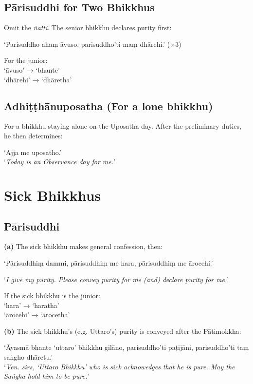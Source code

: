 \subsection{Pārisuddhi for Two Bhikkhus}

Omit the \emph{ñatti}. The senior bhikkhu declares purity first:

‘Parisuddho ahaṃ āvuso, parisuddho'ti maṃ dhārehi.’ (×3)

For the junior:\\
‘āvuso’ → ‘bhante’\\
‘dhārehi’ → ‘dhāretha’

\subsection{Adhiṭṭhānuposatha (For a lone bhikkhu)}

For a bhikkhu staying alone on the Uposatha day. After the preliminary duties,
he then determines:

‘Ajja me uposatho.’\\
‘\emph{Today is an Observance day for me.}’

\section{Sick Bhikkhus}

\subsection{Pārisuddhi}

\textbf{(a)} The sick bhikkhu makes general confession, then:

‘Pārisuddhiṃ dammi, pārisuddhiṃ me hara, pārisuddhiṃ me ārocehi.’

‘\emph{I give my purity. Please convey purity for me (and) declare purity for me.}’

If the sick bhikkhu is the junior:\\
‘hara’ → ‘haratha’\\
‘ārocehi’ → ‘ārocetha’

\clearpage

\textbf{(b)} The sick bhikkhu's (e.g. Uttaro's) purity is conveyed after the
Pātimokkha:

‘Āyasmā bhante ‘uttaro’ bhikkhu gilāno, parisuddho'ti paṭijāni, parisuddho'ti taṃ saṅgho dhāretu.’\\
‘\emph{Ven. sirs, ‘Uttaro Bhikkhu’ who is sick acknowedges that he is pure. May
  the Saṅgha hold him to be pure.}’

